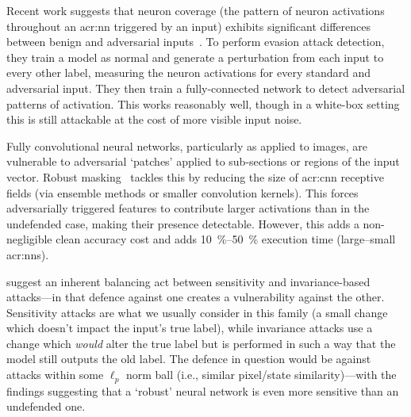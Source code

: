 
Recent work suggests that neuron coverage (the pattern of neuron activations throughout an \gls{acr:nn} triggered by an input) exhibits significant differences between benign and adversarial inputs~\parencite{DBLP:conf/eurosp/SperlKCLB20}.
To perform evasion attack detection, they train a model as normal and generate a perturbation from each input to every other label, measuring the neuron activations for every standard and adversarial input.
They then train a fully-connected network to detect adversarial patterns of activation.
This works reasonably well, though in a white-box setting this is still attackable at the cost of more visible input noise.


Fully convolutional neural networks, particularly as applied to images, are vulnerable to adversarial `patches' applied to sub-sections or regions of the input vector.
Robust masking~\parencite{DBLP:conf/uss/0001BSM21} tackles this by reducing the size of \gls{acr:cnn} receptive fields (via ensemble methods or smaller convolution kernels).
This forces adversarially triggered features to contribute larger activations than in the undefended case, making their presence detectable.
However, this adds a non-negligible clean accuracy cost and adds \qtyrange{10}{50}{\percent} execution time (large--small \glspl{acr:nn}).

\Textcite{DBLP:journals/corr/abs-2002-04599} suggest an inherent balancing act between sensitivity and invariance-based attacks---in that defence against one creates a vulnerability against the other.
Sensitivity attacks are what we usually consider in this family (a small change which doesn't impact the input's true label), while invariance attacks use a change which \emph{would} alter the true label but is performed in such a way that the model still outputs the old label.
The defence in question would be against attacks within some $\ell_p$ norm ball (i.e., similar pixel/state similarity)---with the findings suggesting that a `robust' neural network is even more sensitive than an undefended one.

